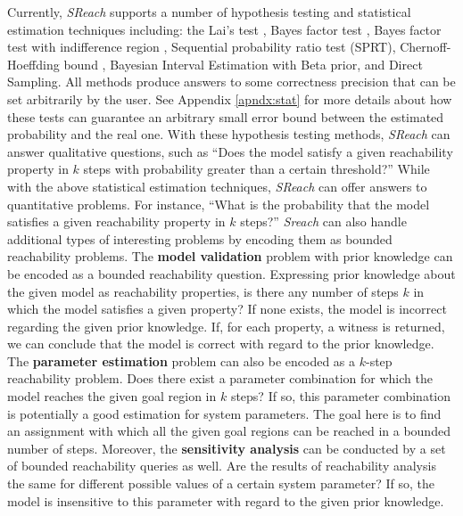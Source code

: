 Currently, {\it SReach} supports a number of hypothesis testing and statistical estimation techniques including: the {Lai's test} \cite{lai1988nearly}, {Bayes factor test} \cite{kass1995bayes}, {Bayes factor test with indifference region} \cite{younes2005verification}, {Sequential probability ratio test (SPRT)}\cite{wald1945sequential}, {Chernoff-Hoeffding bound} \cite{hoeffding1963probability}, {Bayesian Interval Estimation with Beta prior}\cite{zuliani2010bayesian}, and {Direct Sampling}. All methods produce answers to some correctness precision that can be set arbitrarily by the user. See Appendix \ref{apndx:stat} for more details about how these tests can guarantee an arbitrary small error bound between the estimated probability and the real one. With these hypothesis testing methods, {\it SReach} can answer qualitative questions, such as ``Does the model satisfy a given reachability property in $k$ steps with probability greater than a certain threshold?'' While with the above statistical estimation techniques, {\it SReach} can offer answers to quantitative problems. For instance, ``What is the probability that the model satisfies a given reachability property in $k$ steps?''  {\it Sreach} can also handle additional types of interesting problems by encoding them as bounded reachability problems. The {\bf model validation} problem with prior knowledge can be encoded as a bounded reachability question. Expressing prior knowledge about the given model as reachability properties, is there any number of steps $k$ in which the model satisfies a given property? If none exists, the model is incorrect regarding the given prior knowledge. If, for each property, a witness is returned, we can conclude that the model is correct with regard to the prior knowledge. The {\bf parameter estimation} problem can also be encoded as a $k$-step reachability problem. Does there exist a parameter combination for which the model reaches the given goal region in $k$ steps? If so, this parameter combination is potentially a good estimation for system parameters. The goal here is to find an assignment with which all the given goal regions can be reached in a bounded number of steps. Moreover, the {\bf sensitivity analysis} can be conducted by a set of bounded reachability queries as well. Are the results of reachability analysis the same for different possible values of a certain system parameter? If so, the model is insensitive to this parameter with regard to the given prior knowledge.


